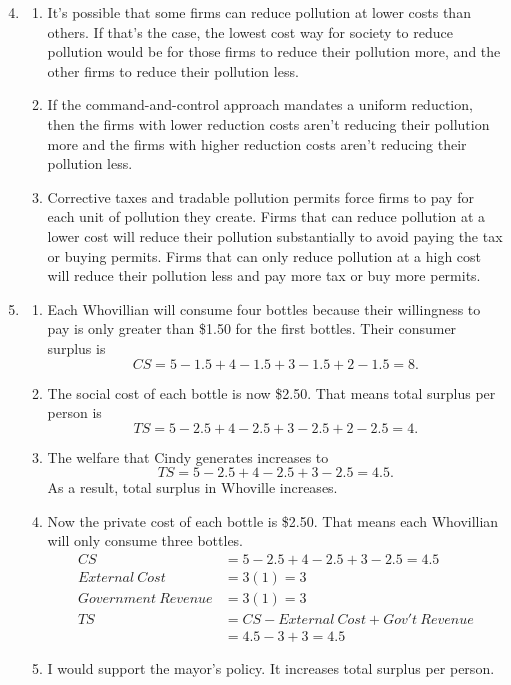 \documentclass{article}
\begin{document}
\begin{enumerate}
\setcounter{enumi}{3}

\item 

	\begin{enumerate}

	\item It's possible that some firms can reduce pollution at lower costs than others. If that's the case, the lowest cost way for society to reduce pollution would be for those firms to reduce their pollution more, and the other firms to reduce their pollution less. 
	
	\item If the command-and-control approach mandates a uniform reduction, then the firms with lower reduction costs aren't reducing their pollution more and the firms with higher reduction costs aren't reducing their pollution less. 
	
	\item Corrective taxes and tradable pollution permits force firms to pay for each unit of pollution they create. Firms that can reduce pollution at a lower cost will reduce their pollution substantially to avoid paying the tax or buying permits. Firms that can only reduce pollution at a high cost will reduce their pollution less and pay more tax or buy more permits.

	\end{enumerate}
	
\item

	\begin{enumerate}
	
	\item Each Whovillian will consume four bottles because their willingness to pay is only greater than \$1.50 for the first bottles. Their consumer surplus is
		\[ CS = 5 - 1.5 + 4 - 1.5 + 3 - 1.5 + 2 - 1.5 = 8. \]
		
	\item The social cost of each bottle is now \$2.50. That means total surplus per person is 
		\[TS = 5 - 2.5 + 4 - 2.5 + 3 - 2.5 + 2 - 2.5 = 4. \]
		
	\item The welfare that Cindy generates increases to 
		\[ TS = 5 - 2.5 + 4 - 2.5 + 3 - 2.5 = 4.5. \]
		As a result, total surplus in Whoville increases.
		
	\item Now the private cost of each bottle is \$2.50. That means each Whovillian will only consume three bottles. 
		\begin{align*}
		CS &= 5 - 2.5 + 4 - 2.5 + 3 - 2.5 = 4.5 \\
		External \ Cost &= 3(1) = 3 \\
		Government \ Revenue &= 3(1) = 3 \\
		TS &= CS - External \ Cost + Gov't \ Revenue \\
		&= 4.5 - 3 + 3 = 4.5
		\end{align*}
		
	\item I would support the mayor's policy. It increases total surplus per person.
	
	\end{enumerate}

\end{enumerate}
\end{document}
